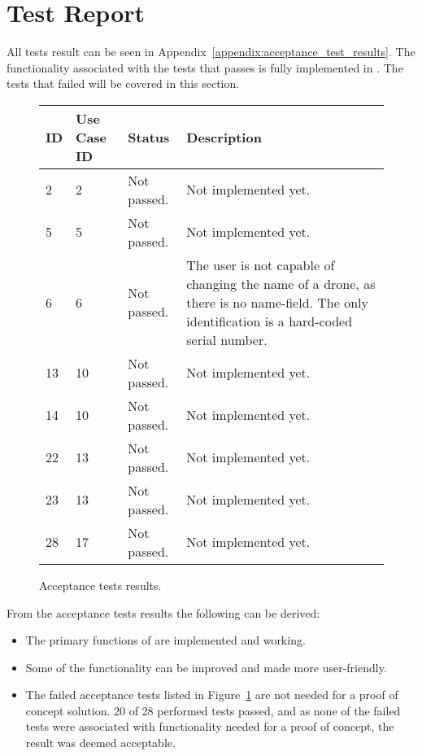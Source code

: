 \section{Test Report}
\label{sec:testing_report}

All tests result can be seen in Appendix~\ref{appendix:acceptance_test_results}.
The functionality associated with the tests that passes is fully implemented in \projectname{}.
The tests that failed will be covered in this section. \\


\begin{figure}[htb]
\begin{center}
\begin{tabular}{ | l | l | l | p{6cm} | }
  \hline
	\textbf{ID} & \textbf{Use Case ID} & \textbf{Status} & \textbf{Description} \\ \hline
	2 & 2 & Not passed. & Not implemented yet. \\ \hline
	5 & 5 & Not passed. & Not implemented yet. \\ \hline
	6 & 6 & Not passed. & The user is not capable of changing the name of a drone, as there is no name-field. The only identification is a hard-coded serial number. \\ \hline
	13 & 10 & Not passed. & Not implemented yet. \\ \hline
	14 & 10 & Not passed. & Not implemented yet. \\ \hline
	22 & 13 & Not passed. & Not implemented yet. \\ \hline
	23 & 13 & Not passed. & Not implemented yet. \\ \hline
	28 & 17 & Not passed. & Not implemented yet. \\ \hline
\end{tabular}
\caption{Acceptance tests results.}
\label{tab:acceptance_tests_results_first_run}
\end{center}
\end{figure}

From the acceptance tests results the following can be derived:

\begin{itemize}
	\item The primary functions of \projectname{} are implemented and working. 
	\item Some of the functionality can be improved and made more user-friendly. 
	\item The failed acceptance tests listed in Figure~\ref{tab:acceptance_tests_results_first_run} are not needed for a proof of concept solution. 20 of 28 performed tests passed, and as none of the failed tests were associated with functionality needed for a proof of concept, the result was deemed acceptable.
\end{itemize}


